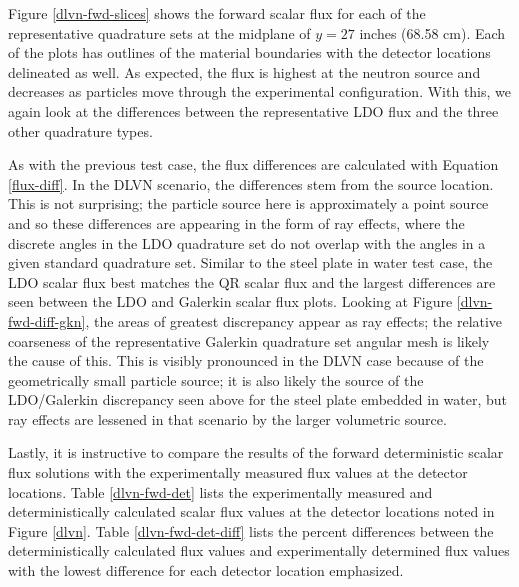 Figure \ref{dlvn-fwd-slices} shows the forward scalar flux for each of the
representative quadrature sets at the midplane of $y = 27$ inches (68.58 cm). Each of 
the plots has outlines of the material boundaries with the detector locations 
delineated as well. As expected, the flux is highest at the neutron source and 
decreases as particles move through the experimental configuration.
With this, we again look at the differences between the representative LDO flux and 
the three other quadrature types. 

As with the previous test case, the flux differences 
are calculated with Equation \ref{flux-diff}. In the DLVN scenario, the 
differences stem from the source location. This is not surprising; the particle source
here is approximately a point source and so these differences are appearing in the
form of ray effects, where the discrete angles in the LDO quadrature set do not 
overlap with the angles in a given standard quadrature set. Similar to the steel plate
in water test case, the LDO scalar flux best matches the QR scalar flux and the
largest differences are seen between the LDO and Galerkin scalar flux plots. Looking
at Figure \ref{dlvn-fwd-diff-gkn}, the areas of greatest discrepancy appear as ray
effects; the relative coarseness of the representative Galerkin quadrature set angular
mesh is likely the cause of this. This is visibly pronounced in the DLVN case because
of the geometrically small particle source; it is also likely the source of the 
LDO/Galerkin discrepancy seen above for the steel plate embedded in water, but ray
effects are lessened in that scenario by the larger volumetric source.

Lastly, it is instructive to compare the results of the forward deterministic scalar
flux solutions with the experimentally measured flux values at the detector locations.
Table \ref{dlvn-fwd-det} lists the experimentally measured \cite{dlvn1991} and
deterministically calculated scalar flux values at the detector locations noted in 
Figure \ref{dlvn}. Table \ref{dlvn-fwd-det-diff} lists the percent differences 
between the deterministically calculated flux values and experimentally determined 
flux values with the lowest difference for each detector location emphasized.

